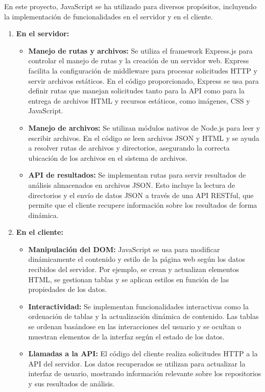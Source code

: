 \documentclass[a4paper, 12pt]{book}
\begin{document}
En este proyecto, JavaScript se ha utilizado para diversos propósitos, incluyendo la implementación de funcionalidades en el servidor y en el cliente.

\begin{enumerate}
    \item \textbf{En el servidor:}
    \begin{itemize}
        \item \textbf{Manejo de rutas y archivos:} Se utiliza el framework Express.js para controlar el manejo de rutas y la creación de un servidor web. Express facilita la configuración de middleware para procesar solicitudes HTTP y servir archivos estáticos. En el código proporcionado, Express se usa para definir rutas que manejan solicitudes tanto para la API como para la entrega de archivos HTML y recursos estáticos, como imágenes, CSS y JavaScript.
        \item \textbf{Manejo de archivos:} Se utilizan módulos nativos de Node.js para leer y escribir archivos. En el código se leen archivos JSON y HTML y se ayuda a resolver rutas de archivos y directorios, asegurando la correcta ubicación de los archivos en el sistema de archivos.
        \item \textbf{API de resultados:} Se implementan rutas para servir resultados de análisis almacenados en archivos JSON. Esto incluye la lectura de directorios y el envío de datos JSON a través de una API RESTful, que permite que el cliente recupere información sobre los resultados de forma dinámica.
    \end{itemize}
    
    \item \textbf{En el cliente:}
    \begin{itemize}
        \item \textbf{Manipulación del DOM:} JavaScript se usa para modificar dinámicamente el contenido y estilo de la página web según los datos recibidos del servidor. Por ejemplo, se crean y actualizan elementos HTML, se gestionan tablas y se aplican estilos en función de las propiedades de los datos.
        \item \textbf{Interactividad:} Se implementan funcionalidades interactivas como la ordenación de tablas y la actualización dinámica de contenido. Las tablas se ordenan basándose en las interacciones del usuario y se ocultan o muestran elementos de la interfaz según el estado de los datos.
        \item \textbf{Llamadas a la API:} El código del cliente realiza solicitudes HTTP a la API del servidor. Los datos recuperados se utilizan para actualizar la interfaz de usuario, mostrando información relevante sobre los repositorios y sus resultados de análisis.
    \end{itemize}
\end{enumerate}
\end{document}

